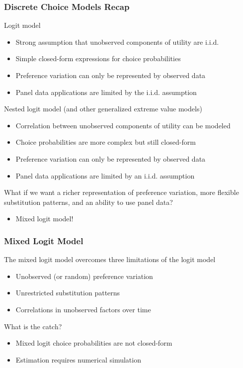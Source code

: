 \documentclass{beamer}
\begin{document}
\begin{frame}\frametitle{Discrete Choice Models Recap}
    Logit model
    \begin{itemize}
        \item Strong assumption that unobserved components of utility are i.i.d.
        \item Simple closed-form expressions for choice probabilities
        \item Preference variation can only be represented by observed data
        \item Panel data applications are limited by the i.i.d. assumption
    \end{itemize}
    \vspace{2ex}
    Nested logit model (and other generalized extreme value models)
    \begin{itemize}
        \item Correlation between unobserved components of utility can be modeled
        \item Choice probabilities are more complex but still closed-form
        \item Preference variation can only be represented by observed data
        \item Panel data applications are limited by an i.i.d. assumption
    \end{itemize}
    \vspace{2ex}
    What if we want a richer representation of preference variation, more flexible substitution patterns, and an ability to use panel data?
    \begin{itemize}
        \item Mixed logit model!
    \end{itemize}
\end{frame}


\begin{frame}\frametitle{Mixed Logit Model}
    The mixed logit model overcomes three limitations of the logit model
    \begin{itemize}
        \item Unobserved (or random) preference variation
        \item Unrestricted substitution patterns
        \item Correlations in unobserved factors over time
    \end{itemize}
    \vspace{3ex}
    What is the catch?
    \begin{itemize}
        \item Mixed logit choice probabilities are not closed-form
        \item Estimation requires numerical simulation
    \end{itemize}
\end{frame}
\end{document}

